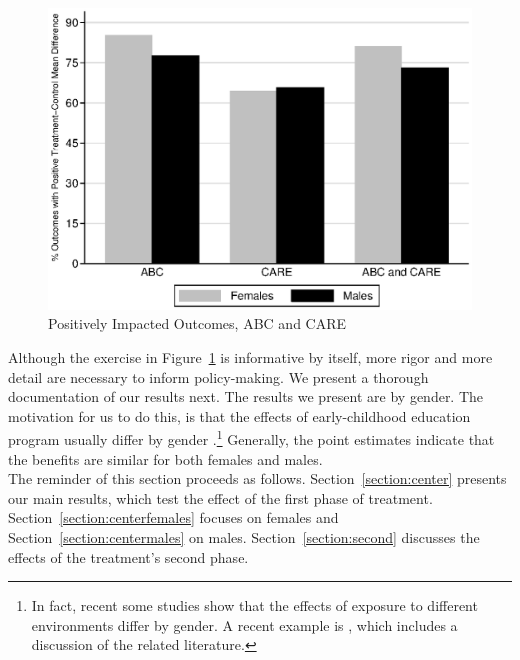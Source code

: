 \begin{figure}[H]
		\caption{Positively Impacted Outcomes, ABC and CARE} \label{fig:ppositive}
		\includegraphics[width=.9\columnwidth]{output/abccare_positiveeffects.eps}
\end{figure}

\noindent Although the exercise in Figure~\ref{fig:ppositive} is informative by itself, more rigor and more detail are necessary to inform policy-making. We present a thorough documentation of our results next. The results we present are by gender. The motivation for us to do this, is that the effects of early-childhood education program usually differ by gender \citep{Heckman_Moon_etal_2010_QE,Campbell_Conti_etal_2014_EarlyChildhoodInvestments}.\footnote{In fact, recent some studies show that the effects of exposure to different environments differ by gender. A recent example is \citet{Autor-etal_2015_Family-Disadvantage}, which includes a discussion of the related literature.} Generally, the point estimates indicate that the benefits are similar for both females and males.\\

\noindent The reminder of this section proceeds as follows. Section~\ref{section:center} presents our main results, which test the effect of the first phase of treatment. Section~\ref{section:centerfemales} focuses on females and Section~\ref{section:centermales} on males. Section~\ref{section:second} discusses the effects of the treatment's second phase.\\

